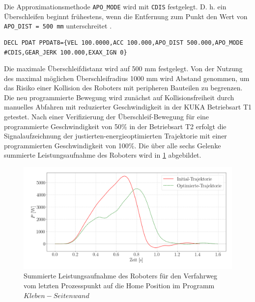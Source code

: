 Die Approximationsmethode \lstinline|APO_MODE| wird mit \lstinline|CDIS| festgelegt. D. h. ein Überschleifen beginnt frühestens, wenn die Entfernung zum Punkt den Wert von \lstinline|APO_DIST = 500 mm| unterschreitet \cite[S.~578]{KSS.2023}.
\begin{lstlisting}[numbers=none]
	DECL PDAT PPDAT8={VEL 100.0000,ACC 100.000,APO_DIST 500.000,APO_MODE #CDIS,GEAR_JERK 100.000,EXAX_IGN 0}
\end{lstlisting}
Die maximale Überschleifdistanz wird auf 500 mm festgelegt. Von der Nutzung des maximal möglichen Überschleifradius 1000 mm wird Abstand genommen, um das Risiko einer Kollision des Roboters mit peripheren Bauteilen zu begrenzen. Die neu programmierte Bewegung wird zunächst auf Kollisionsfreiheit durch manuelles Abfahren mit reduzierter Geschwindigkeit in der KUKA Betriebsart T1 getestet. Nach einer Verifizierung der Überschleif-Bewegung für eine programmierte Geschwindigkeit von 50\% in der Betriebsart T2 erfolgt die Signalaufzeichnung der justierten-energieoptimierten Trajektorie mit einer programmierten Geschwindigkeit von 100\%. Die über alle sechs Gelenke summierte Leistungsaufnahme des Roboters wird in \ref{fig:pup} abgebildet. 
%
\begin{figure}[tbph]
	\centering
	\includegraphics[width=1\linewidth]{images/P_up}
	\caption{Summierte Leistungsaufnahme des Roboters für den Verfahrweg vom letzten Prozesspunkt auf die  Home Position im Programm $Kleben-Seitenwand$}
	\label{fig:pup}
\end{figure}
%

